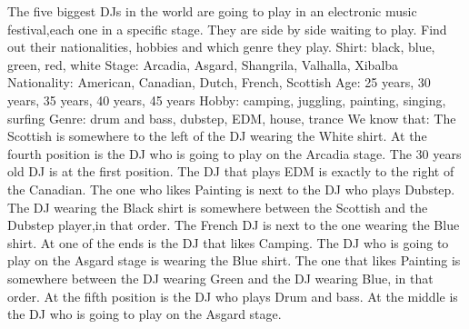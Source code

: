 ﻿\documentclass[a4paper,12pt]{report}
\begin{document}
\vspace{2cm}
The five biggest DJs in the world are going to play in an electronic music festival,each \newline one in a specific stage. They are side by side waiting to play. Find out their nationalities, hobbies and which genre they play.
\newline
\newline
Shirt: black, blue, green, red, white\newline
Stage: Arcadia, Asgard, Shangri­la, Valhalla, Xibalba\newline
Nationality: American, Canadian, Dutch, French,\newline
Scottish 
Age: 25 years, 30 years, 35 years, 40 years, 45 years\newline
Hobby: camping, juggling, painting, singing, surfing\newline
Genre: drum and bass, dubstep, EDM, house, trance\newline
\newline
We know that:
\newline
The Scottish is somewhere to the left of the DJ wearing the White shirt.\newline
At the fourth position is the DJ who is going to play on the Arcadia stage.\newline
The 30 years old DJ is at the first position.\newline
The DJ that plays EDM is exactly to the right of the Canadian.\newline
The one who likes Painting is next to the DJ who plays Dubstep.\newline
The DJ wearing the Black shirt is somewhere between the Scottish and the Dubstep player,\newline in that order.\newline
The French DJ is next to the one wearing the Blue shirt.\newline
At one of the ends is the DJ that likes Camping.\newline
The DJ who is going to play on the Asgard stage is wearing the Blue shirt.\newline
The one that likes Painting is somewhere between the DJ wearing Green and the DJ \newline wearing Blue, in that order.\newline
At the fifth position is the DJ who plays Drum and bass.\newline
At the middle is the DJ who is going to play on the Asgard stage.\newline
\end{document}
